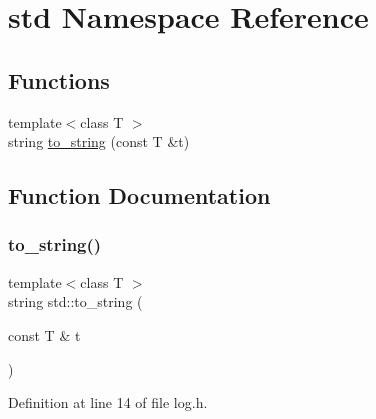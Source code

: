 \hypertarget{namespacestd}{}\section{std Namespace Reference}
\label{namespacestd}
\subsection*{Functions}
\begin{DoxyCompactItemize}
\item 
{\footnotesize template$<$class T $>$ }\\string \hyperlink{namespacestd_ad028a2646c9302d478995256bdbd9459}{to\+\_\+string} (const T \&t)
\end{DoxyCompactItemize}


\subsection{Function Documentation}
\mbox{\label{namespacestd_ad028a2646c9302d478995256bdbd9459}} 
\subsubsection{\texorpdfstring{to\+\_\+string()}{to\_string()}}
{\footnotesize\ttfamily template$<$class T $>$ \\
string std\+::to\+\_\+string (\begin{DoxyParamCaption}\item[{const T \&}]{t }\end{DoxyParamCaption})}



Definition at line 14 of file log.\+h.

